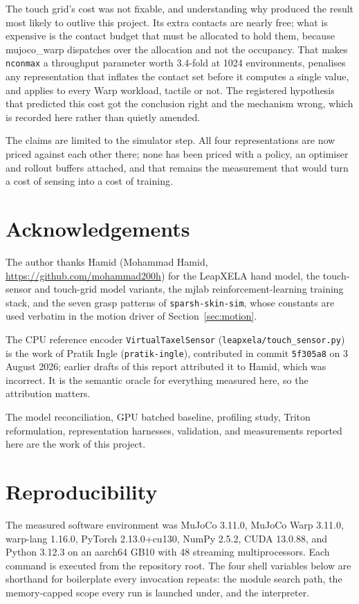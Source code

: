 \documentclass[journal]{IEEEtran}
\begin{document}
The touch grid's cost was not fixable, and understanding why produced the result most likely to outlive this project. Its extra contacts are nearly free; what is expensive is the contact budget that must be allocated to hold them, because mujoco\_warp dispatches over the allocation and not the occupancy. That makes \texttt{nconmax} a throughput parameter worth 3.4-fold at 1024 environments, penalises any representation that inflates the contact set before it computes a single value, and applies to every Warp workload, tactile or not. The registered hypothesis that predicted this cost got the conclusion right and the mechanism wrong, which is recorded here rather than quietly amended.

The claims are limited to the simulator step. All four representations are now priced against each other there; none has been priced with a policy, an optimiser and rollout buffers attached, and that remains the measurement that would turn a cost of sensing into a cost of training.

\section*{Acknowledgements}

The author thanks Hamid (Mohammad Hamid, \url{https://github.com/mohammad200h}) for the LeapXELA hand model, the touch-sensor and touch-grid model variants, the mjlab reinforcement-learning training stack, and the seven grasp patterns of \texttt{sparsh-skin-sim}, whose constants are used verbatim in the motion driver of Section~\ref{sec:motion}.

The CPU reference encoder \texttt{VirtualTaxelSensor} (\texttt{leapxela/touch\_sensor.py}) is the work of Pratik Ingle (\texttt{pratik-ingle}), contributed in commit \texttt{5f305a8} on 3 August 2026; earlier drafts of this report attributed it to Hamid, which was incorrect. It is the semantic oracle for everything measured here, so the attribution matters.

The model reconciliation, GPU batched baseline, profiling study, Triton reformulation, representation harnesses, validation, and measurements reported here are the work of this project.

\appendices
\section{Reproducibility}

The measured software environment was MuJoCo 3.11.0, MuJoCo Warp 3.11.0, warp-lang 1.16.0, PyTorch 2.13.0+cu130, NumPy 2.5.2, CUDA 13.0.88, and Python 3.12.3 on an aarch64 GB10 with 48 streaming multiprocessors. Each command is executed from the repository root. The four shell variables below are shorthand for boilerplate every invocation repeats: the module search path, the memory-capped scope every run is launched under, and the interpreter.
\end{document}
